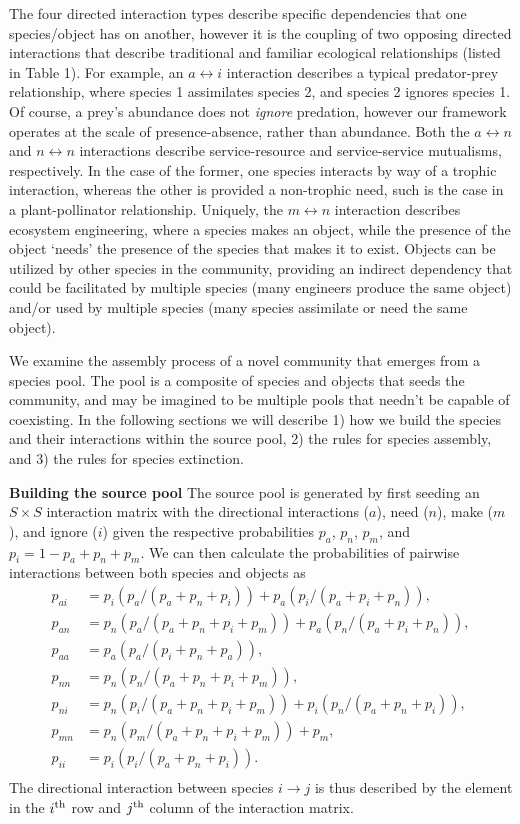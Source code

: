 \documentclass[twocolumn,preprintnumbers,amsmath,amssymb,superscriptaddress]{revtex4}
\begin{document}
The four directed interaction types describe specific dependencies that one species/object has on another, however it is the coupling of two opposing directed interactions that describe traditional and familiar ecological relationships (listed in Table 1).
For example, an $a \leftrightarrow i$ interaction describes a typical predator-prey relationship, where species 1 assimilates species 2, and species 2 ignores species 1.
Of course, a prey's abundance does not \emph{ignore} predation, however our framework operates at the scale of presence-absence, rather than abundance.
Both the $a \leftrightarrow n$ and $n \leftrightarrow n$ interactions describe service-resource and service-service mutualisms, respectively.
In the case of the former, one species interacts by way of a trophic interaction, whereas the other is provided a non-trophic need, such is the case in a plant-pollinator relationship.
Uniquely, the $m \leftrightarrow n$ interaction describes ecosystem engineering, where a species makes an object, while the presence of the object `needs' the presence of the species that makes it to exist.
Objects can be utilized by other species in the community, providing an indirect dependency that could be facilitated by multiple species (many engineers produce the same object) and/or used by multiple species (many species assimilate or need the same object).

We examine the assembly process of a novel community that emerges from a species pool.
The pool is a composite of species and objects that seeds the community, and may be imagined to be multiple pools that needn't be capable of coexisting.
In the following sections we will describe
1) how we build the species and their interactions within the source pool,
2) the rules for species assembly, and 
3) the rules for species extinction.



\textbf{Building the source pool} The source pool is generated by first seeding an $S \times S$ interaction matrix with the directional interactions ($a$), need ($n$), make ($m$), and ignore ($i$) given the respective probabilities $p_a$, $p_n$, $p_m$, and $p_i = 1 - p_a + p_n + p_m$. 
We can then calculate the probabilities of pairwise interactions between both species and objects as 
\begin{align}
  p_{ai} &= p_i(p_a/(p_a+p_n+p_i)) + p_a(p_i/(p_a+p_i+p_n)), \\ \nonumber
  p_{an} &= p_n(p_a/(p_a+p_n+p_i+p_m)) + p_a(p_n/(p_a+p_i+p_n)), \\ \nonumber
  p_{aa} &= p_a(p_a/(p_i+p_n+p_a)), \\ \nonumber
  p_{nn} &= p_n(p_n/(p_a+p_n+p_i+p_m)), \\ \nonumber
  p_{ni} &= p_n(p_i/(p_a+p_n+p_i+p_m)) + p_i(p_n/(p_a+p_n+p_i)), \\ \nonumber
  p_{mn} &= p_n(p_m/(p_a+p_n+p_i+p_m)) + p_m, \\ \nonumber
  p_{ii} &= p_i(p_i/(p_a+p_n+p_i)).\\ \nonumber
\end{align}
The directional interaction between species $i \rightarrow j$ is thus described by the element in the $i^{\rm th}$ row and $j^{\rm th}$ column of the interaction matrix.
\end{document}
